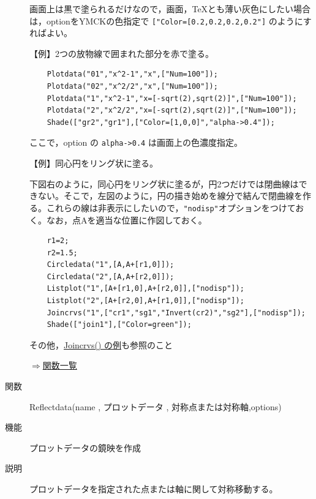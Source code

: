 \documentclass[papersize,a4paper,12pt,uplatex]{jsarticle}
\begin{document}
\begin{description}
画面上は黒で塗られるだけなので，画面，TeXとも薄い灰色にしたい場合は，optionをYMCKの色指定で \verb|["Color=[0.2,0.2,0.2,0.2"]| のようにすればよい。

\vspace{\baselineskip}
【例】2つの放物線で囲まれた部分を赤で塗る。
\begin{verbatim}
    Plotdata("01","x^2-1","x",["Num=100"]);
    Plotdata("02","x^2/2","x",["Num=100"]);
    Plotdata("1","x^2-1","x=[-sqrt(2),sqrt(2)]",["Num=100"]);
    Plotdata("2","x^2/2","x=[-sqrt(2),sqrt(2)]",["Num=100"]);
    Shade(["gr2","gr1"],["Color=[1,0,0]","alpha->0.4"]);
\end{verbatim}

ここで，option の \verb|alpha->0.4| は画面上の色濃度指定。

\vspace{\baselineskip}
\begin{center}   \end{center}
  
\vspace{\baselineskip}
【例】同心円をリング状に塗る。

  下図右のように，同心円をリング状に塗るが，円2つだけでは閉曲線はできない。そこで，左図のように，円の描き始めを線分で結んで閉曲線を作る。これらの線は非表示にしたいので，\verb|"nodisp"|オプションをつけておく。なお，点Aを適当な位置に作図しておく。
\begin{verbatim}
    r1=2;
    r2=1.5;
    Circledata("1",[A,A+[r1,0]]);
    Circledata("2",[A,A+[r2,0]]);
    Listplot("1",[A+[r1,0],A+[r2,0]],["nodisp"]);
    Listplot("2",[A+[r2,0],A+[r1,0]],["nodisp"]);
    Joincrvs("1",["cr1","sg1","Invert(cr2)","sg2"],["nodisp"]);
    Shade(["join1"],["Color=green"]);
\end{verbatim}
\begin{center}   \end{center}

その他，\hyperlink{joincrvs}{Joincrvs() の例}も参照のこと

\begin{flushright}  \hyperlink{functionlist}{$\Rightarrow$関数一覧}\end{flushright}

\hypertarget{reflectdata}{}
\item[関数]  Reflectdata(name , プロットデータ , 対称点または対称軸,options)
\item[機能]  プロットデータの鏡映を作成
\item[説明]  プロットデータを指定された点または軸に関して対称移動する。


\end{description}
\end{document}
